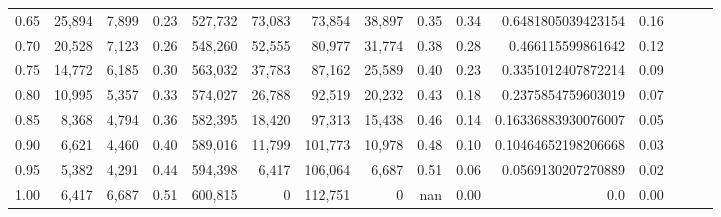 \begin{tabular}{rrrrrrrrrrrrrrr}
0.65 &  25,894 &  7,899 &  0.23 &  527,732 &   73,083 &   73,854 &   38,897 &  0.35 &  0.34 &   0.6481805039423154 &      0.16 \\
0.70 &  20,528 &  7,123 &  0.26 &  548,260 &   52,555 &   80,977 &   31,774 &  0.38 &  0.28 &    0.466115599861642 &      0.12 \\
0.75 &  14,772 &  6,185 &  0.30 &  563,032 &   37,783 &   87,162 &   25,589 &  0.40 &  0.23 &   0.3351012407872214 &      0.09 \\
0.80 &  10,995 &  5,357 &  0.33 &  574,027 &   26,788 &   92,519 &   20,232 &  0.43 &  0.18 &   0.2375854759603019 &      0.07 \\
0.85 &   8,368 &  4,794 &  0.36 &  582,395 &   18,420 &   97,313 &   15,438 &  0.46 &  0.14 &  0.16336883930076007 &      0.05 \\
0.90 &   6,621 &  4,460 &  0.40 &  589,016 &   11,799 &  101,773 &   10,978 &  0.48 &  0.10 &  0.10464652198206668 &      0.03 \\
0.95 &   5,382 &  4,291 &  0.44 &  594,398 &    6,417 &  106,064 &    6,687 &  0.51 &  0.06 &   0.0569130207270889 &      0.02 \\
1.00 &   6,417 &  6,687 &  0.51 &  600,815 &        0 &  112,751 &        0 &   nan &  0.00 &                  0.0 &      0.00 \\
\bottomrule
\end{tabular}
